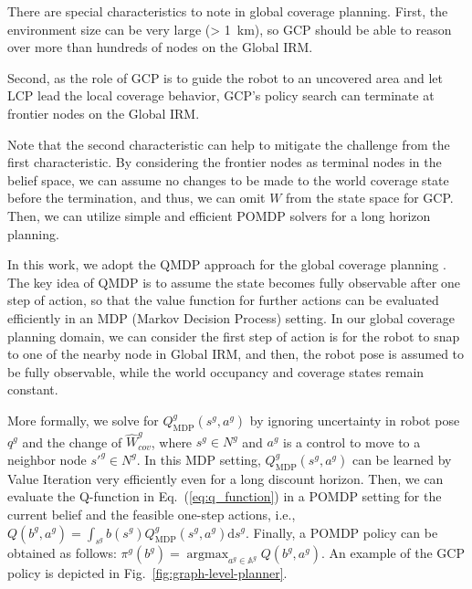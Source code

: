 \documentclass[letterpaper]{article} %
\newcommand{\phdone}[1]{} %
\newcommand{\argmax}{\mathop{\mathrm{argmax}}}
\begin{document}
\phdone{GCP Problem Characteristics--Large-scale}
There are special characteristics to note in global coverage planning. 
First, the environment size can be very large (> 1~km), so GCP should be able to reason over more than hundreds of nodes on the Global IRM.
%
%
\phdone{GCP Problem Characteristics--Frontiers as terminal nodes}
Second, as the role of GCP is to guide the robot to an uncovered area and let LCP lead the local coverage behavior, GCP's policy search can terminate at frontier nodes on the Global IRM.
%
%
\phdone{GCP Problem Approximation}
Note that the second characteristic can help to mitigate the challenge from the first characteristic.
By considering the frontier nodes as terminal nodes in the belief space, we can assume no changes to be made to the world coverage state before the termination, and thus, we can omit $W$ from the state space for GCP.
Then, we can utilize simple and efficient POMDP solvers for a long horizon planning.


\phdone{POMDP Solver for GCP}
In this work, we adopt the QMDP approach for the global coverage planning \cite{littman1995learning}.
The key idea of QMDP is to assume the state becomes fully observable after one step of action, so that the value function for further actions can be evaluated efficiently in an MDP (Markov Decision Process) setting.
In our global coverage planning domain, we can consider the first step of action is for the robot to snap to one of the nearby node in Global IRM, and then, the robot pose is assumed to be fully observable, while the world occupancy and coverage states remain constant.


\phdone{QMDP Details}
More formally, we solve for $Q^g_{\mathrm{MDP}}(s^g, a^g)$ by ignoring uncertainty in robot pose $q^g$ and the change of $\hat{W}^g_{cov}$, where $s^g \in N^g$ and $a^g$ is a control to move to a neighbor node $s'^g \in N^g$.
In this MDP setting, $Q^g_{\mathrm{MDP}}(s^g, a^g)$ can be learned by Value Iteration very efficiently even for a long discount horizon.
%
Then, we can evaluate the Q-function in Eq.~(\ref{eq:q_function}) in a POMDP setting for the current belief and the feasible one-step actions, i.e.,
$Q(b^g, a^g) = \int_{s^g} b(s^g) Q^g_{\mathrm{MDP}}(s^g, a^g) \mathrm{d}s^g$.
%
Finally, a POMDP policy can be obtained as follows:
$\pi^g(b^g) = \argmax_{a^g \in \mathbb{A}^g} Q(b^g, a^g)$.
%
An example of the GCP policy is depicted in Fig.~\ref{fig:graph-level-planner}.
\end{document}
